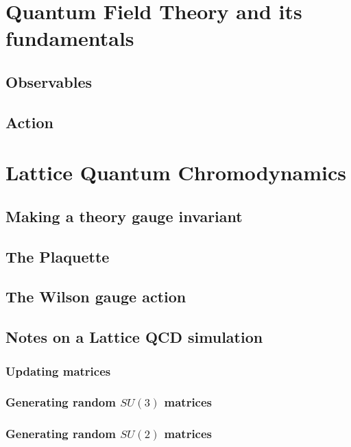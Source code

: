 \documentclass[11pt]{article}
\begin{document}
\section{Quantum Field Theory and its fundamentals}
\subsection{Observables}
\subsection{Action}
\section{Lattice Quantum Chromodynamics}
\subsection{Making a theory gauge invariant}
\subsection{The Plaquette}
\subsection{The Wilson gauge action}
\subsection{Notes on a Lattice QCD simulation}
\subsubsection{Updating matrices}
\subsubsection{Generating random \texorpdfstring{$SU(3)$}{SU3} matrices}
\subsubsection{Generating random \texorpdfstring{$SU(2)$}{SU2} matrices}


% 
\end{document}
